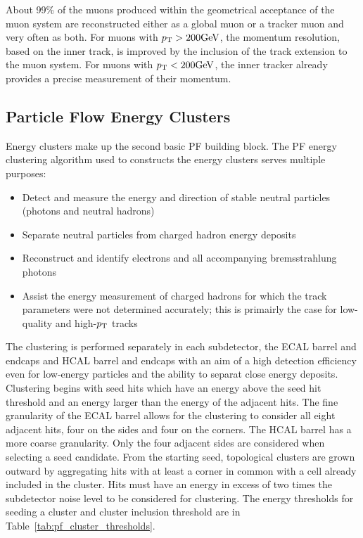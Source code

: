 About 99\% of the muons produced within the geometrical acceptance of the muon system are 
reconstructed either as a global muon or a tracker muon and very often as both.
For muons with $p_\mathrm{T} > 200\mathrm{GeV}$, the momentum resolution, based on the inner track, is 
improved by the inclusion of the track extension to the muon system.
For muons with $p_\mathrm{T} < 200\mathrm{GeV}$, the inner tracker already provides a precise measurement of 
their momentum.


\subsection{Particle Flow Energy Clusters}
Energy clusters make up the second basic PF building block. The PF energy
clustering algorithm used to constructs the energy clusters serves multiple purposes:
\begin{itemize}
\item Detect and measure the energy and direction of stable neutral particles (photons and neutral hadrons)
\item Separate neutral particles from charged hadron energy deposits
\item Reconstruct and identify electrons and all accompanying bremsstrahlung photons
\item Assist the energy measurement of charged hadrons for which the track parameters were not 
determined accurately; this is primairly the case for low-quality and high-$p_\mathrm{T}$ tracks
\end{itemize}
The clustering is performed separately in each subdetector, the ECAL barrel and endcaps and HCAL barrel
and endcaps with an aim of a high detection efficiency even for low-energy particles and the ability to 
separat close energy deposits. Clustering begins with seed hits which have an energy above the seed hit
threshold and an energy larger than the energy of the adjacent hits. The fine granularity of the 
ECAL barrel allows
for the clustering to consider all eight adjacent hits, four on the sides and four on the corners.
The HCAL barrel has a more coarse granularity. Only the four adjacent sides are considered when
selecting a seed candidate. From the starting seed, topological clusters are grown outward by aggregating
hits with at least a corner in common with a cell already included in the cluster. Hits must have an energy
in excess of two times the subdetector noise level to be considered for clustering. The energy thresholds
for seeding a cluster and cluster inclusion threshold are in Table~\ref{tab:pf_cluster_thresholds}.



